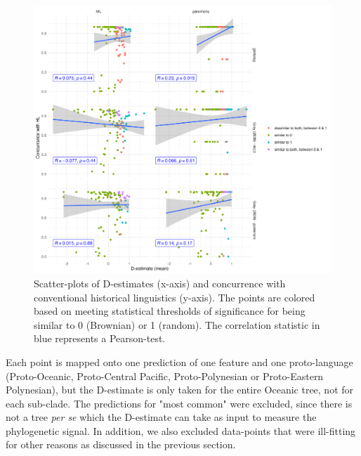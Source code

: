 \documentclass[12pt,letterpaper]{article}
\begin{document}
\begin{figure}[ht]
\centering
\includegraphics[width=18cm]{illustrations/plots_from_R/phylo_d_vs_HL_concurrance.png}
\caption{Scatter-plots of D-estimates (x-axis) and concurrence with conventional historical linguistics (y-axis). The points are colored based on meeting statistical thresholds of significance for being similar to 0 (Brownian) or 1 (random). The correlation statistic in blue represents a Pearson-test.}
\label{fig:phylo_d_plot_vs_concurrence}
\end{figure}

Each point is mapped onto one prediction of one feature and one proto-language (Proto-Oceanic, Proto-Central Pacific, Proto-Polynesian or Proto-Eastern Polynesian), but the D-estimate is only taken for the entire Oceanic tree, not for each sub-clade. The predictions for "most common" were excluded, since there is not a tree \emph{per se} which the D-estimate can take as input to measure the phylogenetic signal. In addition, we also excluded data-points that were ill-fitting for other reasons as discussed in the previous section.

\FloatBarrier
\end{document}
